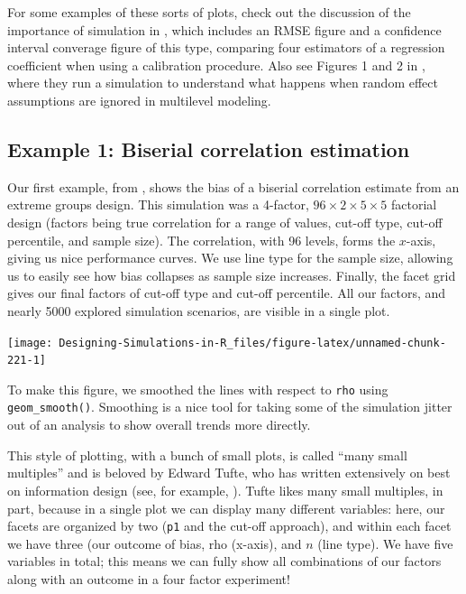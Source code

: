 \documentclass[
]{book}
\begin{document}
For some examples of these sorts of plots, check out the discussion of the importance of simulation in \citet{little2013praise}, which includes an RMSE figure and a confidence interval converage figure of this type, comparing four estimators of a regression coefficient when using a calibration procedure.
Also see Figures 1 and 2 in \citet{antonakis2021ignoring}, where they run a simulation to understand what happens when random effect assumptions are ignored in multilevel modeling.

\subsection{Example 1: Biserial correlation estimation}\label{example-1-biserial-correlation-estimation}

Our first example, from \citet{pustejovsky2014converting}, shows the bias of a biserial correlation estimate from an extreme groups design.
This simulation was a 4-factor, \(96 \times 2 \times 5 \times 5\) factorial design (factors being true correlation for a range of values, cut-off type, cut-off percentile, and sample size).
The correlation, with 96 levels, forms the \(x\)-axis, giving us nice performance curves.
We use line type for the sample size, allowing us to easily see how bias collapses as sample size increases.
Finally, the facet grid gives our final factors of cut-off type and cut-off percentile.
All our factors, and nearly 5000 explored simulation scenarios, are visible in a single plot.

\begin{center}\texttt{[image: Designing-Simulations-in-R\_files/figure-latex/unnamed-chunk-221-1]} \end{center}

To make this figure, we smoothed the lines with respect to \texttt{rho} using \texttt{geom\_smooth()}.
Smoothing is a nice tool for taking some of the simulation jitter out of an analysis to show overall trends more directly.

This style of plotting, with a bunch of small plots, is called
``many small multiples'' and is beloved by Edward Tufte, who has written extensively on best on information design (see, for example, \citet{tufte1983visual}).
Tufte likes many small multiples, in part, because in a single plot we can display many different variables: here, our facets are organized by two (\texttt{p1} and the cut-off approach), and within each facet we have three (our outcome of bias, rho (x-axis), and \(n\) (line type).
We have five variables in total; this means we can fully show all combinations of our factors along with an outcome in a four factor experiment!
\end{document}
